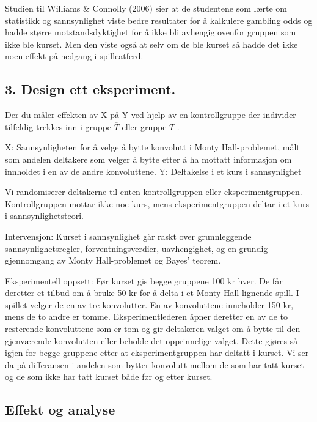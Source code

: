 \documentclass[
  12pt,
  a4paper,
  DIV=11,
  numbers=noendperiod]{scrartcl}
\begin{document}
Studien til Williams \& Connolly (2006) sier at de studentene som lærte
om statistikk og sannsynlighet viste bedre resultater for å kalkulere
gambling odds og hadde større motstandsdyktighet for å ikke bli avhengig
ovenfor gruppen som ikke ble kurset. Men den viste også at selv om de
ble kurset så hadde det ikke noen effekt på nedgang i spilleatferd.

\clearpage

\subsection{3. Design ett eksperiment.}\label{design-ett-eksperiment.}

Der du måler effekten av X på Y ved hjelp av en kontrollgruppe der
individer tilfeldig trekkes inn i gruppe \(\overline T\) eller gruppe
\(T\) .

X: Sannsynligheten for å velge å bytte konvolutt i Monty Hall-problemet,
målt som andelen deltakere som velger å bytte etter å ha mottatt
informasjon om innholdet i en av de andre konvoluttene. Y: Deltakelse i
et kurs i sannsynlighet

Vi randomiserer deltakerne til enten kontrollgruppen eller
eksperimentgruppen. Kontrollgruppen mottar ikke noe kurs, mens
eksperimentgruppen deltar i et kurs i sannsynlighetsteori.

Intervensjon: Kurset i sannsynlighet går raskt over grunnleggende
sannsynlighetsregler, forventningsverdier, uavhengighet, og en grundig
gjennomgang av Monty Hall-problemet og Bayes' teorem.

Eksperimentell oppsett: Før kurset gis begge gruppene 100 kr hver. De
får deretter et tilbud om å bruke 50 kr for å delta i et Monty
Hall-lignende spill. I spillet velger de en av tre konvolutter. En av
konvoluttene inneholder 150 kr, mens de to andre er tomme.
Eksperimentlederen åpner deretter en av de to resterende konvoluttene
som er tom og gir deltakeren valget om å bytte til den gjenværende
konvolutten eller beholde det opprinnelige valget. Dette gjøres så igjen
for begge gruppene etter at eksperimentgruppen har deltatt i kurset. Vi
ser da på differansen i andelen som bytter konvolutt mellom de som har
tatt kurset og de som ikke har tatt kurset både før og etter kurset.

\clearpage

\subsection{Effekt og analyse}\label{effekt-og-analyse}
\end{document}

